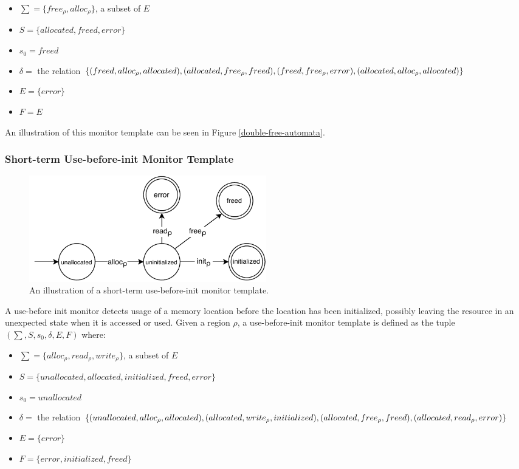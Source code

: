 \begin{itemize}
    \item $\sum = \{free_\rho, alloc_\rho\}$, a subset of $E$
    \item $S = \{ allocated, freed, error \}$
    \item $s_0 = freed$ 
    \item $\delta =$ the relation $\{(freed, alloc_\rho, allocated), (allocated, free_\rho, freed), \\
    (freed, free_\rho, error), (allocated, alloc_\rho, allocated)\}$ 
    \item $E = \{ error \}$  
    \item $F = E$
\end{itemize}

An illustration of this monitor template can be seen in Figure \ref{double-free-automata}. 

\subsubsection*{Short-term Use-before-init Monitor Template}

\begin{figure}[H]
    \centering
    \includegraphics[width=0.5\textwidth]{algorithm/figures/use-before}
    \caption{An illustration of a short-term use-before-init monitor template.}
    \label{use-before-automata}
\end{figure}

A use-before init monitor detects usage of a memory location before the location has been initialized, possibly leaving the resource in an unexpected state when it is accessed or used. Given a region $\rho$, a use-before-init monitor template is defined as the tuple $(\sum, S, s_0, \delta, E, F)$ where: 

\begin{itemize}
    \item $\sum = \{alloc_\rho, read_\rho, write_\rho\}$, a subset of $E$
    \item $S = \{ unallocated, allocated, initialized, freed, error \}$
    \item $s_0 = unallocated$ 
    \item $\delta =$ the relation $\{(unallocated, alloc_\rho, allocated), (allocated, write_\rho, initialized), \\
    (allocated, free_\rho, freed), (allocated, read_\rho, error)\}$ 
    \item $E = \{ error \}$  
    \item $F = \{ error, initialized, freed \}$
\end{itemize}

